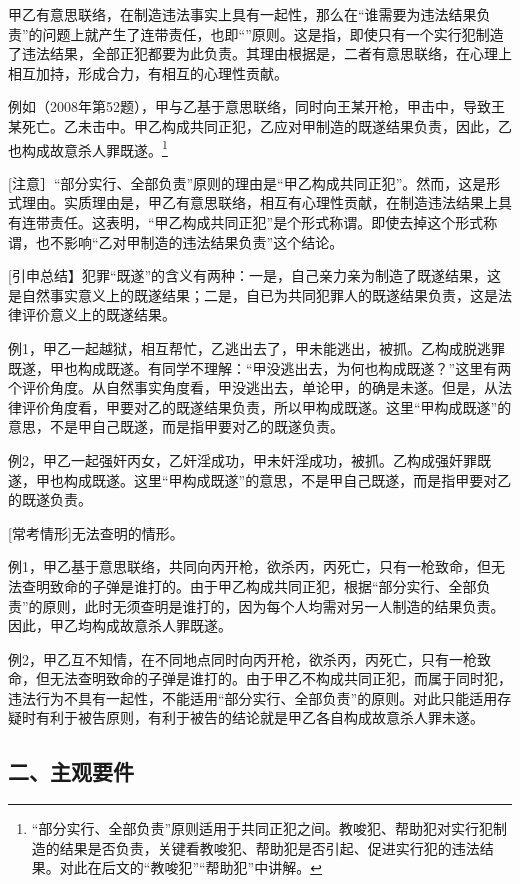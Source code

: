 甲乙有意思联络，在制造违法事实上具有一起性，那么在“谁需要为违法结果负责”的问题上就产生了连带责任，也即“”原则。这是指，即使只有一个实行犯制造了违法结果，全部正犯都要为此负责。其理由根据是，二者有意思联络，在心理上相互加持，形成合力，有相互的心理性贡献。

例如（2008年第52题），甲与乙基于意思联络，同时向王某开枪，甲击中，导致王某死亡。乙未击中。甲乙构成共同正犯，乙应对甲制造的既遂结果负责，因此，乙也构成故意杀人罪既遂。\footnote{“部分实行、全部负责”原则适用于共同正犯之间。教唆犯、帮助犯对实行犯制造的结果是否负责，关键看教唆犯、帮助犯是否引起、促进实行犯的违法结果。对此在后文的“教唆犯”“帮助犯”中讲解。}

[注意］“部分实行、全部负责”原则的理由是“甲乙构成共同正犯”。然而，这是形式理由。实质理由是，甲乙有意思联络，相互有心理性贡献，在制造违法结果上具有连带责任。这表明，“甲乙构成共同正犯”是个形式称谓。即使去掉这个形式称谓，也不影响“乙对甲制造的违法结果负责”这个结论。

[引申总结】犯罪“既遂”的含义有两种：一是，自己亲力亲为制造了既遂结果，这是自然事实意义上的既遂结果；二是，自已为共同犯罪人的既遂结果负责，这是法律评价意义上的既遂结果。

例1，甲乙一起越狱，相互帮忙，乙逃出去了，甲未能逃出，被抓。乙构成脱逃罪既遂，甲也构成既遂。有同学不理解：“甲没逃出去，为何也构成既遂？”这里有两个评价角度。从自然事实角度看，甲没逃出去，单论甲，的确是未遂。但是，从法律评价角度看，甲要对乙的既遂结果负责，所以甲构成既遂。这里“甲构成既遂”的意思，不是甲自己既遂，而是指甲要对乙的既遂负责。

例2，甲乙一起强奸丙女，乙奸淫成功，甲未奸淫成功，被抓。乙构成强奸罪既遂，甲也构成既遂。这里“甲构成既遂”的意思，不是甲自己既遂，而是指甲要对乙的既遂负责。

[常考情形]无法查明的情形。

例1，甲乙基于意思联络，共同向丙开枪，欲杀丙，丙死亡，只有一枪致命，但无法查明致命的子弹是谁打的。由于甲乙构成共同正犯，根据“部分实行、全部负责”的原则，此时无须查明是谁打的，因为每个人均需对另一人制造的结果负责。因此，甲乙均构成故意杀人罪既遂。

例2，甲乙互不知情，在不同地点同时向丙开枪，欲杀丙，丙死亡，只有一枪致命，但无法查明致命的子弹是谁打的。由于甲乙不构成共同正犯，而属于同时犯，违法行为不具有一起性，不能适用“部分实行、全部负责”的原则。对此只能适用存疑时有利于被告原则，有利于被告的结论就是甲乙各自构成故意杀人罪未遂。

\subsection*{二、主观要件}

